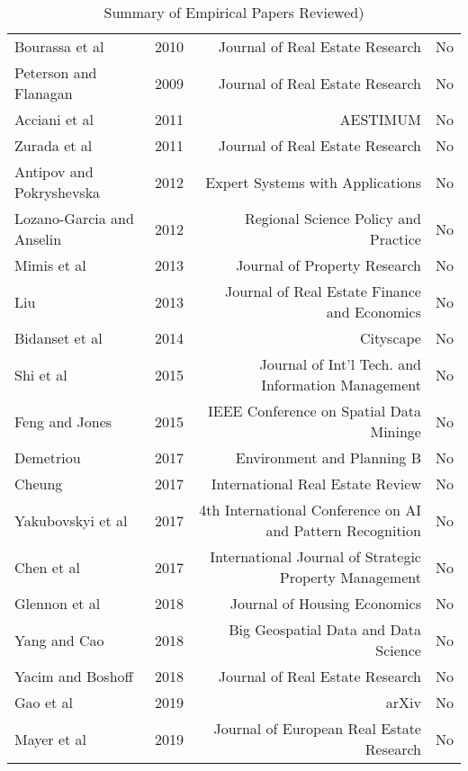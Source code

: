 \documentclass[colTwo]{anon}
\theoremstyle{definition}
\begin{document}
\begin{table}[h!]
\begin{tabular}{|l|l|r|c|}
Bourassa et al & 2010 & Journal of Real Estate Research & No \\
Peterson and Flanagan & 2009 & Journal of Real Estate Research & No \\
Acciani et al & 2011 & AESTIMUM & No \\
Zurada et al & 2011 & Journal of Real Estate Research & No \\
Antipov and Pokryshevska & 2012 & Expert Systems with Applications & No \\
Lozano-Garcia and Anselin & 2012 & Regional Science Policy and Practice & No \\
Mimis et al & 2013 & Journal of Property Research & No \\
Liu & 2013 & Journal of Real Estate Finance and Economics & No \\
Bidanset et al & 2014 & Cityscape & No \\
Shi et al & 2015 & Journal of Int'l Tech. and Information Management & No \\
Feng and Jones & 2015 & IEEE Conference on Spatial Data Mininge & No \\
Demetriou & 2017 & Environment and Planning B & No \\
Cheung & 2017 & International Real Estate Review & No \\
Yakubovskyi et al & 2017 & 4th International Conference on AI and Pattern Recognition & No \\
Chen et al & 2017 & International Journal of Strategic Property Management & No \\
Glennon et al  & 2018 & Journal of Housing Economics & No \\
Yang and Cao & 2018 & Big Geospatial Data and Data Science & No \\
Yacim and Boshoff & 2018 & Journal of Real Estate Research & No \\
Gao et al & 2019 & arXiv & No \\
Mayer et al & 2019 & Journal of European Real Estate Research & No \\
\hline
\end{tabular}
\caption{Summary of Empirical Papers Reviewed)}
\label{table:8}
\end{table}
\end{document}
